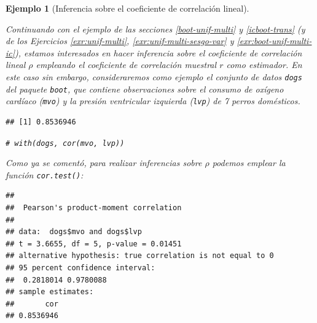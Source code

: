 \documentclass[
]{book}
\newenvironment{Shaded}{\begin{snugshade}}{\end{snugshade}}
\newcommand{\AttributeTok}[1]{\textcolor[rgb]{0.77,0.63,0.00}{#1}}
\newcommand{\CommentTok}[1]{\textcolor[rgb]{0.56,0.35,0.01}{\textit{#1}}}
\newcommand{\FunctionTok}[1]{\textcolor[rgb]{0.00,0.00,0.00}{#1}}
\newcommand{\NormalTok}[1]{#1}
\newcommand{\SpecialCharTok}[1]{\textcolor[rgb]{0.00,0.00,0.00}{#1}}
\newcommand{\StringTok}[1]{\textcolor[rgb]{0.31,0.60,0.02}{#1}}
\theoremstyle{break}
\newtheorem{example}{Ejemplo}[chapter]
\theoremstyle{nonumberplain}
\renewcommand{\CommentTok}[1]{\textcolor[rgb]{0.41,0.41,0.41}{\texttt{#1}}}
\begin{document}
\begin{example}[Inferencia sobre el coeficiente de correlación lineal]
\protect\hypertarget{exm:perm-test-cor}{}\label{exm:perm-test-cor}

Continuando con el ejemplo de las secciones \ref{boot-unif-multi} y \ref{icboot-trans} (y de los Ejercicios \ref{exr:unif-multi}, \ref{exr:unif-multi-sesgo-var} y \ref{exr:boot-unif-multi-ic}), estamos interesados en hacer inferencia sobre el coeficiente de correlación lineal \(\rho\) empleando el coeficiente de correlación muestral \(r\) como estimador.
En este caso sin embargo, consideraremos como ejemplo el conjunto de datos \texttt{dogs}
del paquete \texttt{boot}, que contiene observaciones sobre el consumo de
oxígeno cardíaco (\texttt{mvo}) y la presión ventricular izquierda (\texttt{lvp})
de 7 perros domésticos.

\begin{Shaded}
\end{Shaded}

\begin{verbatim}
## [1] 0.8536946
\end{verbatim}

\begin{Shaded}
\begin{Highlighting}[]
\CommentTok{\# with(dogs, cor(mvo, lvp))}
\end{Highlighting}
\end{Shaded}

Como ya se comentó, para realizar inferencias sobre \(\rho\) podemos emplear la función \texttt{cor.test()}:

\begin{Shaded}
\end{Shaded}

\begin{verbatim}
## 
##  Pearson's product-moment correlation
## 
## data:  dogs$mvo and dogs$lvp
## t = 3.6655, df = 5, p-value = 0.01451
## alternative hypothesis: true correlation is not equal to 0
## 95 percent confidence interval:
##  0.2818014 0.9780088
## sample estimates:
##       cor 
## 0.8536946
\end{verbatim}


\end{example}
\end{document}
